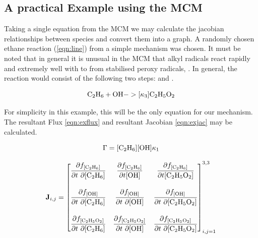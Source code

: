 \subsection{A practical Example using the MCM}\label{sec:jacpractical}

Taking a single equation from the MCM we may calculate the jacobian relationships between species and convert them into a graph. A randomly chosen ethane reaction (\autoref{eqn:line}) from a simple mechanism was chosen. It must be noted that in general it is unusual in the MCM that alkyl radicals react rapidly and extremely well with  to from stabilised peroxy radicals, \citep{mcmorigin}. In general, the reaction would consist of the following two steps:
and .

\begin{equation}
\label{eqn:line}
\ce{C2H6} + \ce{OH} ->[\kappa_3] \ce{C2H5O2}
\end{equation}

For simplicity in this example, this will be the only equation for our mechanism. The resultant Flux \autoref{eqn:exflux} and resultant Jacobian \autoref{eqn:exjac} may be calculated.

\begin{equation}\label{eqn:exflux}
   \Gamma = [\ce{C2H6}][\ce{OH}]\kappa_1 \\[15pt]
\end{equation}

   \begin{eqnarray}
    \mathbf{J}_{i,j} =
 \begin{bmatrix}
   \dfrac{\partial f_{[\ce{C2H6}]}}{\partial t \ \partial {[\ce{C2H6}]}} &
     \dfrac{\partial f_{[\ce{C2H6}]}}{\partial t{[\ce{OH}]}} &
     \dfrac{\partial f_{[\ce{C2H6}]}}{ \partial t{[\ce{C2H5O2}]}} \\[20pt]
   \dfrac{\partial f_{[\ce{OH}]}}{\partial t \ \partial {[\ce{C2H6}]}} &
     \dfrac{\partial f_{[\ce{OH}]}}{\partial t \ \partial {[\ce{OH}]}} &
   \dfrac{\partial f_{[\ce{OH}]}}{\partial t \ \partial {[\ce{C2H5O2}]}} \\[20pt]
   \dfrac{\partial f_{[\ce{C2H5O2}]}}{\partial t \ \partial {[\ce{C2H6}]}} &
     \dfrac{\partial f_{[\ce{C2H5O2}]}}{\partial t \ \partial {[\ce{OH}]}} &
     \dfrac{\partial f_{[\ce{C2H5O2}]}}{\partial t \ \partial {[\ce{C2H5O2}]}}
 \end{bmatrix}_{i,j=1}^{3,3}
 \label{eqn:exjac}
\end{eqnarray}\\



